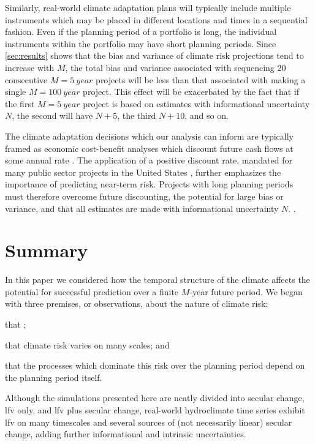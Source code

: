 \documentclass[
  draft,
  linenumbers
]{agujournal2019}
\begin{document}
Similarly, real-world climate adaptation plans will typically include multiple instruments which may be placed in different locations and times in a sequential fashion.
Even if the planning period of a portfolio is long, the individual instruments within the portfolio may have short planning periods.
Since \cref{sec:results} shows that the bias and variance of climate risk projections tend to increase with $M$, the total bias and variance associated with sequencing 20 consecutive $M=\SI{5}{year}$ projects will be less than that associated with making a single $M=\SI{100}{year}$ project.
This effect will be exacerbated by the fact that if the first $M=\SI{5}{year}$ project is based on estimates with informational uncertainty $N$, the second will have $N+5$, the third $N+10$, and so on.

The climate adaptation decisions which our analysis can inform are typically framed as economic cost-benefit analyses which discount future cash flows at some annual rate \citep{sodastrom:1999,powers:2003}.
The application of a positive discount rate, mandated for many public sector projects in the United States \citep{powers:2003}, further emphasizes the importance of predicting near-term risk.
Projects with long planning periods must therefore overcome future discounting, the potential for large bias or variance, and that all estimates are made with informational uncertainty $N$.
.

\section{Summary}

In this paper we considered how the temporal structure of the climate affects the potential for successful prediction over a finite $M$-year future period.
We began with three premises, or observations, about the nature of climate risk:
\begin{enumerate*}[label= (\roman*)]
  \item that ;
  \item that climate risk varies on many scales; and
  \item that the processes which dominate this risk over the planning period depend on the planning period itself.
\end{enumerate*}
Although the simulations presented here are neatly divided into secular change, \gls{lfv} only, and \gls{lfv} plus secular change, real-world hydroclimate time series exhibit \gls{lfv} on many timescales and several sources of (not necessarily linear) secular change, adding further informational and intrinsic uncertainties.
\end{document}

